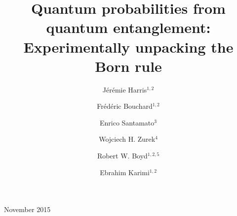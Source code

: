 \documentclass[12pt]{iopart}
\begin{document}
%
\title[Quantum probabilities from quantum entanglement]{Quantum probabilities from quantum entanglement: Experimentally unpacking the Born rule}
%
\author{J\'er\'emie Harris$^{1,2}$}
\address{$^1$Department of Physics, University of Ottawa, 25 Templeton, Ottawa, Ontario, K1N 6N5 Canada}
\address{$^2$The Max Planck Centre for Extreme and Quantum Photonics, University of Ottawa, Ottawa, Ontario, K1N 6N5, Canada}

\author{Fr\'ed\'eric Bouchard$^{1,2}$}
\address{$^1$Department of Physics, University of Ottawa, 25 Templeton, Ottawa, Ontario, K1N 6N5 Canada}
\address{$^2$The Max Planck Centre for Extreme and Quantum Photonics, University of Ottawa, Ottawa, Ontario, K1N 6N5, Canada}

\author{Enrico Santamato$^{3}$}
\address{$^3$Dipartimento di Fisica, Universit\`a di Napoli Federico II, Compl. Univ. di Monte S. Angelo, via Cintia, 80126 Napoli, Italy}

\author{Wojciech H. Zurek$^{4}$}
\address{$^4$Theoretical Division, Los Alamos National Laboratory, Los Alamos, NM 87545, USA}

\author{Robert W. Boyd$^{1,2,5}$}
\address{$^1$Department of Physics, University of Ottawa, 25 Templeton, Ottawa, Ontario, K1N 6N5 Canada}
\address{$^2$The Max Planck Centre for Extreme and Quantum Photonics, University of Ottawa, Ottawa, Ontario, K1N 6N5, Canada}
\address{$^5$Institute of Optics, University of Rochester, Rochester, New York, 14627, USA}

\author[cor1]{Ebrahim Karimi$^{1,2}$}
\address{$^1$Department of Physics, University of Ottawa, 25 Templeton, Ottawa, Ontario, K1N 6N5 Canada}
\address{$^2$The Max Planck Centre for Extreme and Quantum Photonics, University of Ottawa, Ottawa, Ontario, K1N 6N5, Canada}


%
\vspace{10pt}
\begin{indented}
\item[]November 2015
\vspace{20pt}
\end{indented}
\end{document}
